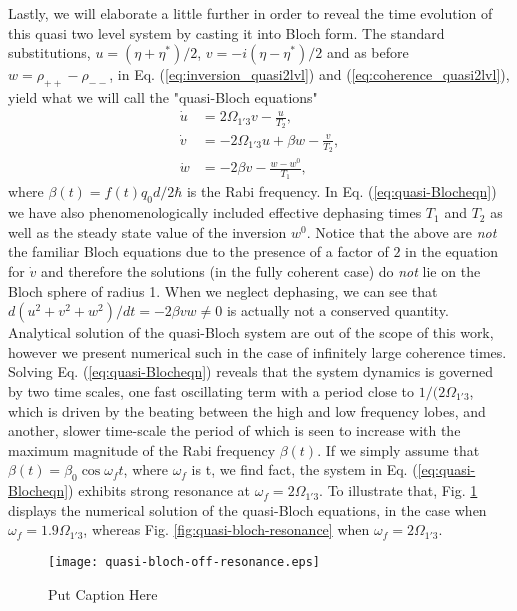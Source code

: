\documentclass[]{spie}  %
\begin{document}
Lastly, we will elaborate a little further in order to reveal the time evolution of this quasi two level system by casting it into Bloch form. The standard substitutions, $u=(\eta + \eta^*)/2$, $v = -i(\eta - \eta^*)/2$ and as before $w = \rho_{++}-\rho_{--}$, in Eq. (\ref{eq:inversion_quasi2lvl}) and (\ref{eq:coherence_quasi2lvl}), yield what we will call the "quasi-Bloch equations"
\begin{subequations}
\label{eq:quasi-Blocheqn}
\begin{align}
\dot{u} &= 2\Omega_{1'3} v - \frac{u}{T_2}, \\
\dot{v} &= -2\Omega_{1'3} u +\beta w - \frac{v}{T_2}, \\
\dot{w} &= -2\beta v - \frac{w-w^0}{T_1},
\end{align}
\end{subequations}
where $\beta(t) = f(t)q_0d/2\hbar$ is the Rabi frequency. In Eq. (\ref{eq:quasi-Blocheqn}) we have also phenomenologically included effective dephasing times $T_1$ and $T_2$ as well as the steady state value of the inversion $w^0$. Notice that the above are \emph{not} the familiar Bloch equations due to the presence of a factor of $2$ in the equation for $\dot{v}$ and therefore the solutions (in the fully coherent case) do \emph{not} lie on the Bloch sphere of radius 1. When we neglect dephasing, we can see that $d(u^2+v^2+w^2)/dt = -2\beta vw \neq 0$ is actually not a conserved quantity. Analytical solution of the quasi-Bloch system are out of the scope of this work, however we present numerical such in the case of infinitely large coherence times. Solving Eq. (\ref{eq:quasi-Blocheqn}) reveals that the system dynamics is governed by two time scales, one fast oscillating term with a period 
close to $1/(2\Omega_{1'3}$, which is driven by the beating between the high and low frequency lobes, and another, slower time-scale the period of which is seen to increase with the maximum magnitude of the Rabi frequency $\beta(t)$. If we simply assume that $\beta(t) = \beta_0 \cos\omega_f t$, where $\omega_f$ is t, we find fact, the system in Eq. (\ref{eq:quasi-Blocheqn}) exhibits strong resonance at $\omega_f = 2\Omega_{1'3}$. To illustrate that, Fig. \ref{fig:quasi-bloch-off-resonance} displays the numerical solution of the quasi-Bloch equations, in the case when  $\omega_f = 1.9\Omega_{1'3}$, whereas Fig. \ref{fig:quasi-bloch-resonance} when $\omega_f = 2\Omega_{1'3}$.


\begin{figure}[h!]
	\begin{center}
		\texttt{[image: quasi-bloch-off-resonance.eps]}
		\caption{ Put Caption Here } \label{fig:quasi-bloch-off-resonance}
	\end{center}	
\end{figure}
\end{document}
